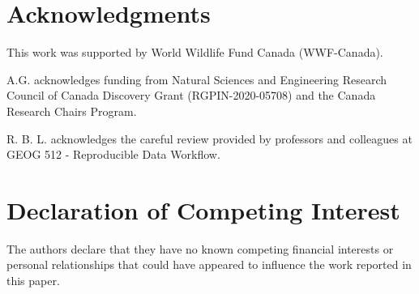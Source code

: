 \documentclass[times,final]{elsarticle.cls}
\begin{document}
\section*{Acknowledgments}
This work was supported by World Wildlife Fund Canada (WWF-Canada).

A.G. acknowledges funding from Natural Sciences and Engineering Research Council of Canada Discovery Grant (RGPIN-2020-05708) and the Canada Research Chairs Program.

R. B. L. acknowledges the careful review provided by professors and colleagues at GEOG 512 - Reproducible Data Workflow.

\section*{Declaration of Competing Interest}

The authors declare that they have no known competing financial interests or personal relationships that could have appeared to influence the work reported in this paper.







% 
% 
\end{document}
